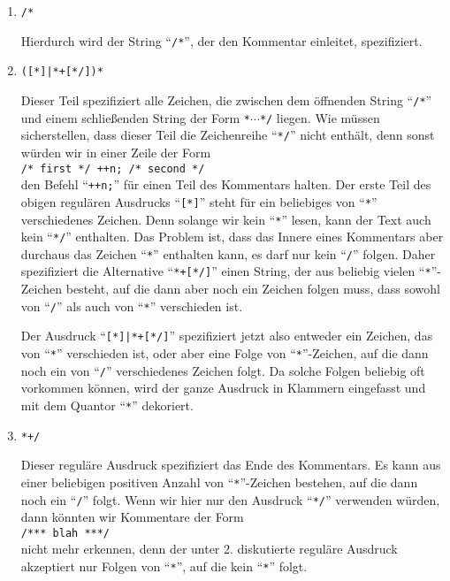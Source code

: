 \begin{enumerate}
\item \texttt{/*} 

      Hierdurch wird der String ``\texttt{/*}'', der den Kommentar einleitet,  spezifiziert.
\item \texttt{([*]|*+[*/])*}
  
      Dieser Teil spezifiziert alle Zeichen, die zwischen dem \"offnenden String ``\texttt{/*}''
      und einem schlie{\ss}enden String der Form \texttt{*$\cdots$*/} liegen.  Wie m\"ussen
      sicherstellen, dass dieser Teil die Zeichenreihe ``\texttt{*/}'' nicht enth\"alt, denn
      sonst w\"urden wir in einer Zeile der Form
      \\[0.2cm]
      \hspace*{1.3cm} \texttt{/* first */ ++n; /* second */}
      \\[0.2cm]
      den Befehl ``\texttt{++n;}'' f\"ur einen Teil des Kommentars halten.  Der erste Teil des
      obigen regul\"aren Ausdrucks ``\texttt{[*]}'' steht f\"ur ein beliebiges
      von ``\texttt{*}'' verschiedenes Zeichen.  Denn solange wir kein ``\texttt{*}'' lesen,
      kann der Text auch kein ``\texttt{*/}'' enthalten.  Das Problem ist, dass das Innere
      eines Kommentars aber durchaus das Zeichen ``\texttt{*}'' enthalten kann, es darf
      nur kein ``\texttt{/}'' folgen.  Daher spezifiziert die Alternative
      ``\texttt{*+[*/]}'' einen String, der aus beliebig vielen 
      ``\texttt{*}''-Zeichen besteht, auf die dann aber noch ein Zeichen folgen muss, dass
      sowohl von ``\texttt{/}'' als auch von ``\texttt{*}'' verschieden ist.
      
      Der Ausdruck ``\texttt{[*]|*+[*/]}''
      spezifiziert jetzt also entweder ein Zeichen, das von ``\texttt{*}'' verschieden
      ist, oder aber eine Folge von ``\texttt{*}''-Zeichen, auf die dann noch ein von
      ``\texttt{/}'' verschiedenes Zeichen folgt.  Da solche Folgen beliebig oft vorkommen
      k\"onnen, wird der ganze Ausdruck in Klammern eingefasst und mit dem Quantor
      ``\texttt{*}'' dekoriert.   
\item \texttt{*+/}

      Dieser regul\"are Ausdruck spezifiziert das Ende des Kommentars.  Es kann aus einer 
      beliebigen positiven Anzahl von ``\texttt{*}''-Zeichen bestehen, auf die dann noch
      ein ``\texttt{/}'' folgt.  Wenn wir hier nur den Ausdruck
      ``\texttt{*/}'' verwenden w\"urden, dann k\"onnten wir Kommentare der
      Form 
      \\[0.2cm]
      \hspace*{1.3cm}
      \texttt{/*** blah ***/}
      \\[0.2cm]
      nicht mehr erkennen, denn der unter 2. diskutierte regul\"are Ausdruck akzeptiert
      nur Folgen von ``\texttt{*}'', auf die kein ``\texttt{*}'' folgt.
\end{enumerate}


